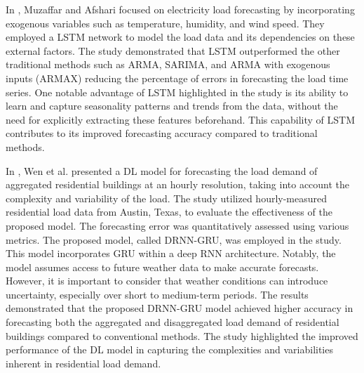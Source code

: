 In \cite{MUZAFFAR20192922}, Muzaffar and Afshari focused on electricity load forecasting by incorporating exogenous variables such as temperature, humidity, and wind speed.
They employed a LSTM network to model the load data and its dependencies on these external factors.
The study demonstrated that LSTM outperformed the other traditional methods such as ARMA, SARIMA, and ARMA with exogenous inputs (ARMAX) reducing the percentage of errors in forecasting the load time series.
One notable advantage of LSTM highlighted in the study is its ability to learn and capture seasonality patterns and trends from the data, without the need for explicitly extracting these features beforehand.
This capability of LSTM contributes to its improved forecasting accuracy compared to traditional methods.

In \cite{WEN2020106073}, Wen et al. presented a DL model for forecasting the load demand of aggregated residential buildings at an hourly resolution, taking into account the complexity and variability of the load.
The study utilized hourly-measured residential load data from Austin, Texas, to evaluate the effectiveness of the proposed model.
The forecasting error was quantitatively assessed using various metrics.
The proposed model, called DRNN-GRU, was employed in the study.
This model incorporates GRU within a deep RNN architecture.
Notably, the model assumes access to future weather data to make accurate forecasts. However, it is important to consider that weather conditions can introduce uncertainty, especially over short to medium-term periods.
The results demonstrated that the proposed DRNN-GRU model achieved higher accuracy in forecasting both the aggregated and disaggregated load demand of residential buildings compared to conventional methods.
The study highlighted the improved performance of the DL model in capturing the complexities and variabilities inherent in residential load demand.

